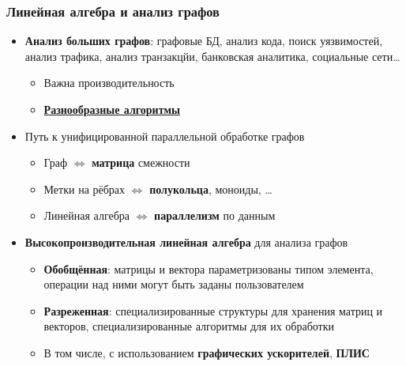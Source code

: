 \documentclass[xcolor=table,aspectratio=169]{beamer}
\begin{document}
\begin{frame}[fragile]
  \frametitle{Линейная алгебра и анализ графов}
  \begin{itemize}
    \item \textbf{Анализ больших графов}: графовые БД, анализ кода, поиск уязвимостей, анализ трафика, анализ транзакцйи, банковская аналитика, социальные сети\ldots
      \begin{itemize}
        \item Важна производительность
        \item \underline{\textbf{Разнообразные алгоритмы}}
      \end{itemize}
    \pause  
    \item Путь к унифицированной параллельной обработке графов  
      \begin{itemize}
        \item Граф $\iff$ \textbf{матрица} смежности
        \item Метки на рёбрах $\iff$ \textbf{полукольца}, моноиды, \ldots
        \item Линейная алгебра $\iff$ \textbf{параллелизм} по данным
      \end{itemize}
    \pause  
    \item \textbf{Высокопроизводительная линейная алгебра} для анализа графов
      \begin{itemize}
        \item \textbf{Обобщённая}: матрицы и вектора параметризованы типом элемента, операции над ними могут быть заданы пользователем
        \item \textbf{Разреженная}: специализированные структуры для хранения матриц и векторов, специализированные алгоритмы для их обработки 
        \item В том числе, с использованием \textbf{графических ускорителей}, \textbf{ПЛИС}
      \end{itemize}
    \end{itemize}
\end{frame}
\end{document}
